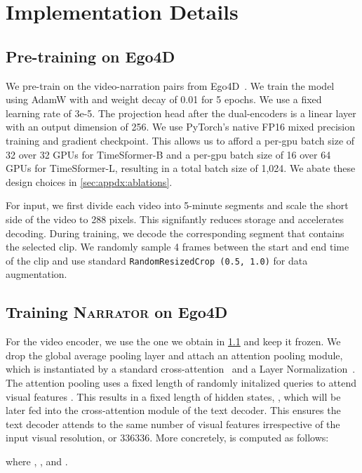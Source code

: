 \documentclass[10pt,twocolumn,letterpaper]{article}
\newcommand{\myparagraph}[1]{\vspace{0pt}\noindent{\bf #1}}
\newcommand{\narrator}{\textsc{Narrator}\xspace}
\begin{document}
\section{Implementation Details}
\label{sec:appdx:impl}

\subsection{Pre-training on Ego4D}
\label{sec:appdx:impl:pretrain_ego4d}
We pre-train on the video-narration pairs from Ego4D~\cite{grauman2022ego4d}.
We train the model using AdamW with  and weight decay of 0.01 for 5 epochs.
We use a fixed learning rate of 3e-5.
The projection head after the dual-encoders is a linear layer with an output dimension of 256.
We use PyTorch's native FP16 mixed precision training and gradient checkpoint.
This allows us to afford a per-gpu batch size of 32 over 32 GPUs for TimeSformer-B and a per-gpu batch size of 16 over 64 GPUs for TimeSformer-L, resulting in a total batch size of 1,024.
We abate these design choices in \cref{sec:appdx:ablations}.

For input, we first divide each video into 5-minute segments and scale the short side of the video to 288 pixels.
This signifantly reduces storage and accelerates decoding.
During training, we decode the corresponding segment that contains the selected clip.
We randomly sample 4 frames between the start and end time of the clip and use standard \texttt{RandomResizedCrop (0.5, 1.0)} for data augmentation.

\subsection{Training \narrator on Ego4D}
\myparagraph{Architecture.}
For the video encoder, we use the one we obtain in \cref{sec:appdx:impl:pretrain_ego4d} and keep it frozen.
We drop the global average pooling layer and attach an attention pooling module, which is instantiated by a standard cross-attention~\cite{vaswani2017attention} and a Layer Normalization~\cite{ba2016layernorm}.
The attention pooling uses a fixed length of randomly initalized queries  to attend visual features .
This results in a fixed length of hidden states, , which will be later fed into the cross-attention module of the text decoder. 
This ensures the text decoder attends to the same number of visual features irrespective of the input visual resolution,  or 336336.
More concretely,  is computed as follows:
{\small

}
where , , and .
\end{document}
